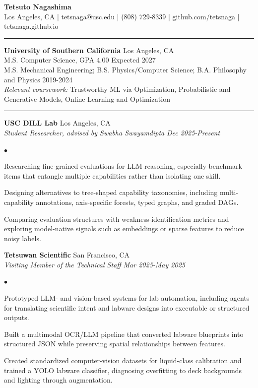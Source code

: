 \documentclass[10pt,letterpaper]{article}
\newenvironment{tightitemize}{%
  \begin{list}{$\bullet$}{%
    \setlength{\leftmargin}{1.05em}
    \setlength{\itemsep}{0pt}
    \setlength{\parsep}{0pt}
    \setlength{\topsep}{1pt}
    \setlength{\partopsep}{0pt}
  }
}{\end{list}}
\newcommand{\ressection}[1]{\vspace{4pt}{\large\textbf{#1}}\par\vspace{1pt}\hrule\vspace{2pt}}
\newcommand{\role}[4]{%
  \textbf{#1} \hfill #2\\
  \textit{#3} \hfill \textit{#4}\\[-1pt]
}
\begin{document}
\fontsize{9.3}{10.2}\selectfont

\begin{center}
{\LARGE \textbf{Tetsuto Nagashima}}\\
Los Angeles, CA | tetsnaga@usc.edu | (808) 729-8339 | github.com/tetsnaga | tetsnaga.github.io
\end{center}

\ressection{Education}
\textbf{University of Southern California} \hfill Los Angeles, CA\\
M.S. Computer Science, GPA 4.00 \hfill Expected 2027\\
M.S. Mechanical Engineering; B.S. Physics/Computer Science; B.A. Philosophy and Physics \hfill 2019-2024\\
\textit{Relevant coursework:} Trustworthy ML via Optimization, Probabilistic and Generative Models, Online Learning and Optimization

\ressection{Research and Experience}
\role{USC DILL Lab}{Los Angeles, CA}{Student Researcher, advised by Swabha Swayamdipta}{Dec 2025-Present}
\begin{tightitemize}
  \item Researching fine-grained evaluations for LLM reasoning, especially benchmark items that entangle multiple capabilities rather than isolating one skill.
  \item Designing alternatives to tree-shaped capability taxonomies, including multi-capability annotations, axis-specific forests, typed graphs, and graded DAGs.
  \item Comparing evaluation structures with weakness-identification metrics and exploring model-native signals such as embeddings or sparse features to reduce noisy labels.
\end{tightitemize}

\role{Tetsuwan Scientific}{San Francisco, CA}{Visiting Member of the Technical Staff}{Mar 2025-May 2025}
\begin{tightitemize}
  \item Prototyped LLM- and vision-based systems for lab automation, including agents for translating scientific intent and labware designs into executable or structured outputs.
  \item Built a multimodal OCR/LLM pipeline that converted labware blueprints into structured JSON while preserving spatial relationships between features.
  \item Created standardized computer-vision datasets for liquid-class calibration and trained a YOLO labware classifier, diagnosing overfitting to deck backgrounds and lighting through augmentation.
\end{tightitemize}
\end{document}

